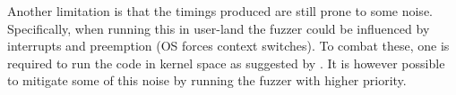 Another limitation is that the timings produced are still prone to some noise.
Specifically, when running this in user-land the fuzzer could be influenced by interrupts and preemption (OS forces context switches). 
To combat these, one is required to run the code in kernel space as suggested by \citep{intel-benchmark-code-execution}.
It is however possible to mitigate some of this noise by running the fuzzer with higher priority. 
